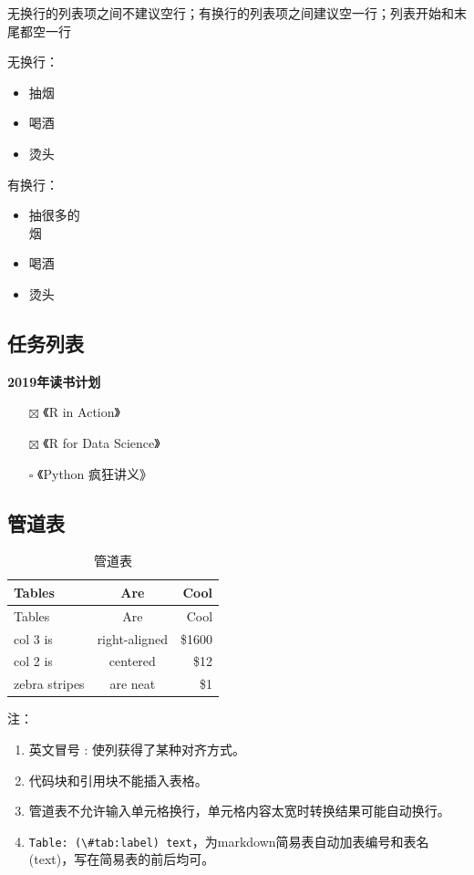 \documentclass[]{article}
\providecommand{\tightlist}{%
  \setlength{\itemsep}{0pt}\setlength{\parskip}{0pt}}
\begin{document}
无换行的列表项之间不建议空行；有换行的列表项之间建议空一行；列表开始和末尾都空一行

无换行：

\begin{itemize}
\tightlist
\item
  抽烟
\item
  喝酒
\item
  烫头
\end{itemize}

有换行：

\begin{itemize}
\item
  抽很多的\\
  烟
\item
  喝酒
\item
  烫头
\end{itemize}

\hypertarget{section-20}{%
\subsection{任务列表}\label{section-20}}

\textbf{2019年读书计划}

\begin{itemize}
\tightlist
\item[$\boxtimes$]
  《R in Action》
\item[$\boxtimes$]
  《R for Data Science》
\item[$\square$]
  《Python 疯狂讲义》
\end{itemize}

\hypertarget{section-21}{%
\subsection{管道表}\label{section-21}}

\begin{longtable}[]{@{}lcr@{}}
\caption{\label{tab:easytable} 管道表}\tabularnewline
\toprule
Tables & Are & Cool\tabularnewline
\midrule
\endfirsthead
\toprule
Tables & Are & Cool\tabularnewline
\midrule
\endhead
col 3 is & right-aligned & \$1600\tabularnewline
col 2 is & centered & \$12\tabularnewline
zebra stripes & are neat & \$1\tabularnewline
\bottomrule
\end{longtable}

注：

\begin{enumerate}
\def\labelenumi{\arabic{enumi}.}
\tightlist
\item
  英文冒号 : 使列获得了某种对齐方式。
\item
  代码块和引用块不能插入表格。
\item
  管道表不允许输入单元格换行，单元格内容太宽时转换结果可能自动换行。
\item
  \texttt{Table:\ (\textbackslash{}\#tab:label)\ text}，为markdown简易表自动加表编号和表名(text)，写在简易表的前后均可。
\end{enumerate}
\end{document}
